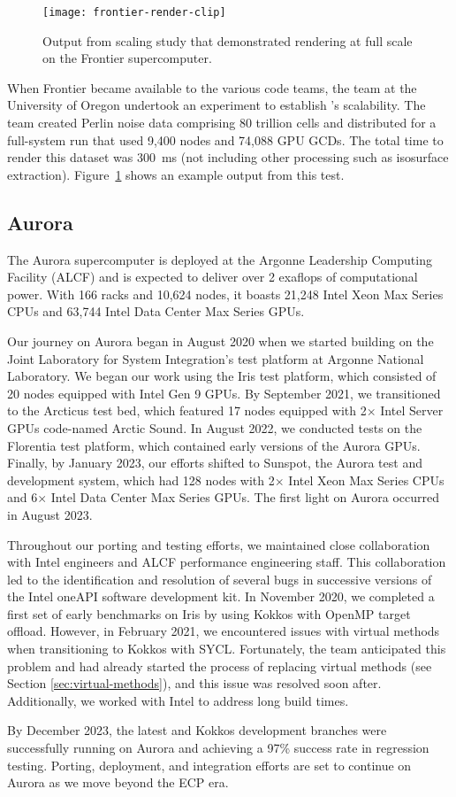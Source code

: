 \begin{figure}[htb]
  \texttt{[image: frontier-render-clip]}
  \caption{
    Output from \vtkm scaling study that demonstrated rendering at full scale on the Frontier supercomputer.
  }
  \label{fig:frontier-render}
\end{figure}

When Frontier became available to the various code teams, the \vtkm team at the University of Oregon undertook an experiment to establish \vtkm's scalability.
The team created Perlin noise data comprising 80 trillion cells and distributed for a full-system run that used 9,400 nodes and 74,088 GPU GCDs.
The total time to render this dataset was 300~ms (not including other processing such as isosurface extraction).
Figure~\ref{fig:frontier-render} shows an example output from this test.


\subsection{Aurora}


The Aurora supercomputer is deployed at the Argonne Leadership Computing Facility (ALCF) and is expected to deliver over 2 exaflops of computational power. With 166 racks and 10,624 nodes, it boasts 21,248 Intel Xeon Max Series CPUs and 63,744 Intel Data Center Max Series GPUs.

Our journey on Aurora began in August 2020 when we started building \vtkm on the Joint Laboratory for System Integration's test platform at Argonne National Laboratory.
We began our work using the Iris test platform, which consisted of 20 nodes equipped with Intel Gen 9 GPUs.
By September 2021, we transitioned to the Arcticus test bed, which featured 17 nodes equipped with 2$\times$ Intel Server GPUs code-named Arctic Sound.
In August 2022, we conducted tests on the Florentia test platform, which contained early versions of the Aurora GPUs.
Finally, by January 2023, our efforts shifted to Sunspot, the Aurora test and development system, which had 128 nodes with 2$\times$ Intel Xeon Max Series CPUs and 6$\times$ Intel Data Center Max Series GPUs.
The first light on Aurora occurred in August 2023.

Throughout our porting and testing efforts, we maintained close collaboration with Intel engineers and ALCF performance engineering staff. This collaboration led to the identification and resolution of several bugs in successive versions of the Intel oneAPI software development kit. In November 2020, we completed a first set of early \vtkm benchmarks on Iris by using Kokkos with OpenMP target offload. However, in February 2021, we encountered issues with virtual methods when transitioning to Kokkos with SYCL. Fortunately, the team anticipated this problem and had already started the process of replacing virtual methods (see Section \ref{sec:virtual-methods}), and this issue was resolved soon after. Additionally, we worked with Intel to address long build times.

By December 2023, the latest \vtkm and Kokkos development branches were successfully running on Aurora and achieving a 97\% success rate in regression testing. Porting, deployment, and integration efforts are set to continue on Aurora as we move beyond the ECP era.

